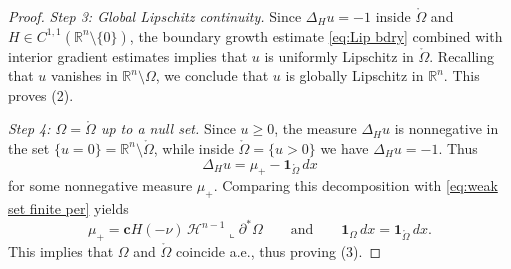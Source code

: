 \documentclass[reqno,11pt]{amsart}
\numberwithin{equation}{section}
\theoremstyle{remark}
\begin{document}
\begin{proof}
\medskip
\noindent\textit{Step 3: Global Lipschitz continuity.}
Since $\Delta_H u=-1$ inside $\mathring\Omega$ and $H\in C^{1,1}(\mathbb R^n\setminus\{0\})$, the boundary growth estimate
\eqref{eq:Lip bdry} combined with interior gradient estimates implies that $u$ is uniformly Lipschitz in $\mathring\Omega$.
Recalling that $u$ vanishes in $\mathbb R^n\setminus \Omega$, we conclude that $u$ is globally Lipschitz in $\mathbb R^n$.
This proves (2).

\medskip
\noindent\textit{Step 4: $\Omega=\mathring\Omega$ up to a null set.}
Since $u \ge 0$, the measure $\Delta_H u$ is nonnegative in the set $\{u=0\}=\mathbb R^n\setminus \mathring\Omega$, while
inside $\mathring\Omega=\{u>0\}$ we have $\Delta_H u=-1$. Thus
\[
\Delta_H u= \mu_+- \mathbf{1}_{\mathring\Omega}\,dx
\]
for some nonnegative measure $\mu_+$. Comparing this decomposition with \eqref{eq:weak set finite per} yields
\[
\mu_+=\mathbf{c}H(-\nu)\,\mathscr{H}^{n-1}\llcorner \partial^*\Omega
\qquad\text{and}\qquad
\mathbf{1}_{\Omega}\,dx=\mathbf{1}_{\mathring\Omega}\,dx.
\]
This implies that $\Omega$ and $\mathring\Omega$ coincide a.e., thus proving (3).


\end{proof}
\end{document}
